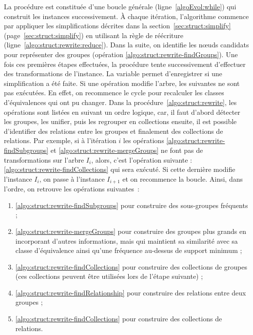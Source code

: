 La procédure est constituée d'une boucle générale (ligne~\ref{algoEvol:while}) qui construit les instances successivement.
À chaque itération, l'algorithme commence par appliquer les simplifications décrites dans la section~\ref{sec:struct:simplify} (page~\ref{sec:struct:simplify}) en utilisant la règle de réécriture \reduce (ligne~\ref{algo:struct:rewrite:reduce}).
Dans la suite, on identifie les nœuds candidats pour représenter des groupes (opération \ref{algo:struct:rewrite-findGroups}).
Une fois ces premières étapes effectuées, la procédure tente successivement d'effectuer des transformations de l'instance.
La variable \simp permet d'enregistrer si une simplification a été faite.
Si une opération modifie l'arbre, les suivantes ne sont pas exécutées.
En effet, on recommence le cycle pour recalculer les classes d'équivalences qui ont pu changer.
Dans la  procédure~\ref{algo:struct:rewrite}, les opérations sont listées en suivant un ordre logique, car, il faut d'abord détecter les groupes, les unifier, puis les regrouper en collections ensuite, il est possible d'identifier des relations entre les groupes et finalement des collections de relations.
Par exemple, si à l'itération $i$ les opérations \ref{algo:struct:rewrite-findSubgroups} et \ref{algo:struct:rewrite-mergeGroups} ne font pas de transformations sur l'arbre $I_i$, alors, c'est l'opération suivante : \ref{algo:struct:rewrite-findCollections} qui sera exécuté.
Si cette dernière modifie l'instance $I_i$, on passe à l'instance $I_{i+1}$ et on recommence la boucle.
Ainsi, dans l'ordre, on retrouve les opérations suivantes :
\begin{enumerate}
    \item \ref{algo:struct:rewrite-findSubgroups} pour construire des sous-groupes fréquents ;
    \item \ref{algo:struct:rewrite-mergeGroups} pour construire des groupes plus grands en incorporant d'autres informations, mais qui maintient sa similarité avec sa classe d'équivalence ainsi qu'une fréquence au-dessus de support minimum ;
    \item \ref{algo:struct:rewrite-findCollections} pour construire des collections de groupes (ces collections peuvent être utilisées lors de l'étape suivante) ;
    \item \ref{algo:struct:rewrite-findRelationship} pour construire des relations entre deux groupes ;
    \item \ref{algo:struct:rewrite-findCollections} pour construire des collections de relations.
\end{enumerate}

